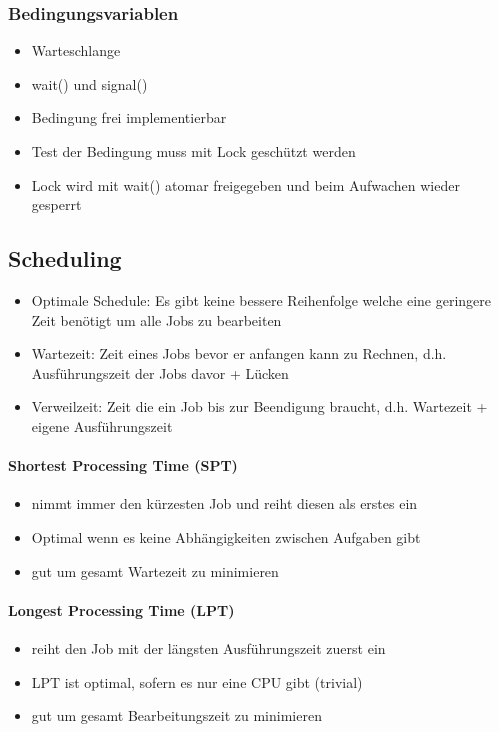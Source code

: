 \documentclass[12pt,a4paper]{article}
\begin{document}
\subsubsection{Bedingungsvariablen}
\begin{itemize}
\item Warteschlange
\item wait() und signal()
\item Bedingung frei implementierbar
\item Test der Bedingung muss mit Lock geschützt werden
\item Lock wird mit wait() atomar freigegeben und beim Aufwachen wieder gesperrt
\end{itemize}

\subsection{Scheduling}

\begin{itemize}
\item Optimale Schedule: Es gibt keine bessere Reihenfolge welche eine geringere Zeit benötigt um alle Jobs zu bearbeiten
\item Wartezeit: Zeit eines Jobs bevor er anfangen kann zu Rechnen, d.h. Ausführungszeit der Jobs davor + Lücken
\item Verweilzeit: Zeit die ein Job bis zur Beendigung braucht, d.h. Wartezeit + eigene Ausführungszeit
\end{itemize}


\paragraph{Shortest Processing Time (SPT)}
\flushleft
\begin{itemize}
\item nimmt immer den kürzesten Job und reiht diesen als erstes ein
\item Optimal wenn es keine Abhängigkeiten zwischen Aufgaben gibt
\item gut um gesamt Wartezeit zu minimieren
\end{itemize}

\paragraph{Longest Processing Time (LPT)}
\flushleft
\begin{itemize}
\item reiht den Job mit der längsten Ausführungszeit zuerst ein
\item LPT ist optimal, sofern es nur eine CPU gibt (trivial)
\item gut um gesamt Bearbeitungszeit zu minimieren
\end{itemize}
\end{document}

